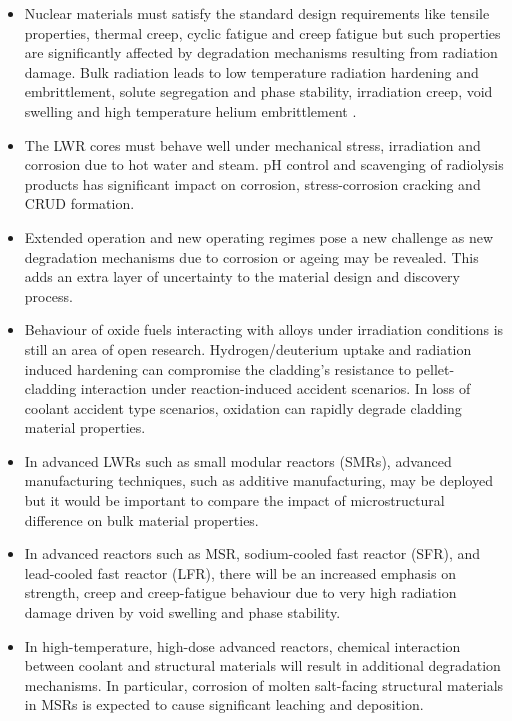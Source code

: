 	\begin{itemize}
		\item Nuclear materials must satisfy the standard design requirements like tensile properties, thermal creep, cyclic fatigue and creep fatigue but such properties are significantly affected by degradation mechanisms resulting from radiation damage. Bulk radiation leads to  low temperature radiation hardening and embrittlement, solute segregation and phase stability, irradiation creep, void swelling and high temperature helium embrittlement \cite{Olander:76,Was:2017aa}.
		\item The LWR cores must behave well under mechanical stress, irradiation and corrosion due to hot water and steam. pH control and scavenging of radiolysis products has significant impact on corrosion, stress-corrosion cracking and CRUD formation.
		\item Extended operation and new operating regimes pose a new challenge as new degradation mechanisms due to corrosion or ageing may be revealed. This adds an extra layer of uncertainty to the material design and discovery process.
		\item Behaviour of oxide fuels interacting with  alloys under irradiation conditions is still an area of open research. Hydrogen/deuterium uptake and radiation induced hardening can compromise the cladding's resistance to pellet-cladding interaction under reaction-induced accident scenarios. In loss of coolant accident type scenarios,  oxidation can rapidly degrade cladding material properties.
		\item In advanced LWRs such as small modular reactors (SMRs), advanced manufacturing techniques, such as additive manufacturing, may be deployed but it would be important to compare the impact of microstructural difference on bulk material properties.
		\item In advanced reactors such as MSR, sodium-cooled fast reactor (SFR), and lead-cooled fast reactor (LFR), there will be an increased emphasis on strength, creep and creep-fatigue behaviour due to very high radiation damage driven by void swelling and phase stability.
		\item In high-temperature, high-dose advanced reactors, chemical interaction between coolant and structural materials will result in additional degradation mechanisms. In particular, corrosion of molten salt-facing structural materials in MSRs is expected to cause significant leaching and deposition.
	\end{itemize}
	
